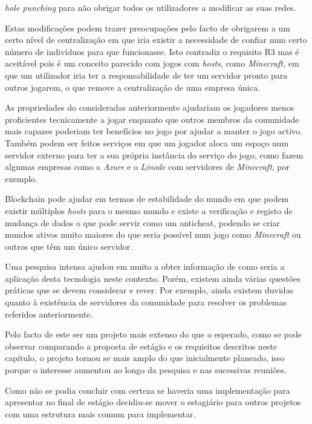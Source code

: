 \textit{hole punching} para não obrigar todos os utilizadores a modificar as suas redes.

Estas modificações podem trazer preocupações pelo facto de obrigarem a um certo nível de centralização em que iria existir a necessidade de confiar num certo número de indivíduos para que funcionasse. Isto contradiz o requisito R3 mas é aceitável pois é um conceito parecido com jogos com \textit{hosts}, como \textit{Minecraft}, em que um utilizador iria ter a responsabilidade de ter um servidor pronto para outros jogarem, o que remove a centralização de uma empresa única. 

As propriedades do \gamechaining{} consideradas anteriormente ajudariam os jogadores menos proficientes tecnicamente a jogar enquanto que outros membros da comunidade mais capazes poderiam ter benefícios no jogo por ajudar a manter o jogo activo. Também podem ser feitos serviços em que um jogador aloca um espaço num servidor externo para ter a sua própria instância do serviço do jogo, como fazem algumas empresas como a \textit{Azure} e o \textit{Linode} com servidores de \textit{Minecraft}, por exemplo.

Blockchain pode ajudar em termos de estabilidade do mundo em que podem existir múltiplos \textit{hosts} para o mesmo mundo e existe a verificação e registo de mudança de dados o que pode servir como um \gls{anticheat}, podendo se criar mundos ativos muito maiores do que seria possível num jogo como \textit{Minecraft} ou outros que têm um único servidor.

Uma pesquisa intensa ajudou em muito a obter informação de como seria a aplicação desta tecnologia neste contexto. Porém, existem ainda várias questões práticas que se devem considerar e rever. Por exemplo,  ainda existem duvidas quanto à existência de servidores da comunidade para resolver os problemas referidos anteriormente.

Pelo facto de este ser um projeto mais extenso do que o esperado, como se pode observar comparando a proposta de estágio e os requisitos descritos neste capítulo, o projeto tornou se mais amplo do que inicialmente planeado, isso porque o interesse aumentou ao longo da pesquisa e nas sucessivas reuniões. 

Como não se podia concluir com certeza se haveria uma implementação para apresentar no final de estágio decidiu-se mover o estagiário para outros projetos com uma estrutura mais comum para implementar.
